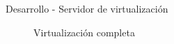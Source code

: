 \begin{frame}{Desarrollo - Servidor de virtualización}
    \begin{figure}[!tbp]
      \centering
      \begin{minipage}[b]{0.4\textwidth}
        \caption{\scriptsize Virtualización completa}
      \end{minipage}
      \begin{minipage}[b]{0.5\textwidth}

\end{minipage}
\end{figure}
\end{frame}
